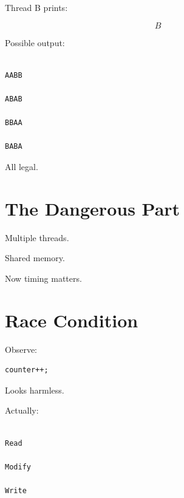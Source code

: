 \documentclass[11pt,a4paper]{book}
\begin{document}
Thread B prints:

\[
B
\]


Possible output:

\begin{verbatim}

AABB

ABAB

BBAA

BABA

\end{verbatim}


All legal.


\section{The Dangerous Part}

Multiple threads.


Shared memory.


Now timing matters.


\section{Race Condition}

Observe:

\begin{verbatim} 
counter++;
\end{verbatim}


Looks harmless.


Actually:

\begin{verbatim}

Read

Modify

Write

\end{verbatim}
\end{document}
